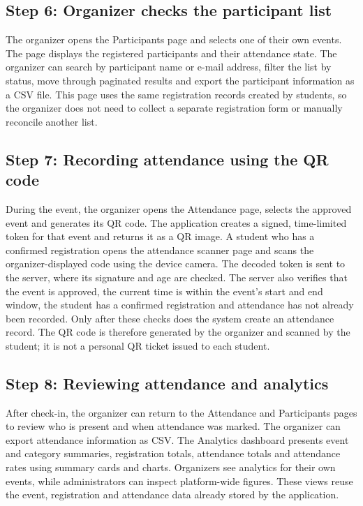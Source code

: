 \documentclass[11pt,a4paper]{article}
\begin{document}
\subsection{Step 6: Organizer checks the participant list}
The organizer opens the Participants page and selects one of their own events. The page displays
the registered participants and their attendance state. The organizer can search by participant
name or e-mail address, filter the list by status, move through paginated results and export the
participant information as a CSV file. This page uses the same registration records created by
students, so the organizer does not need to collect a separate registration form or manually
reconcile another list.

\subsection{Step 7: Recording attendance using the QR code}
During the event, the organizer opens the Attendance page, selects the approved event and
generates its QR code. The application creates a signed, time-limited token for that event and
returns it as a QR image. A student who has a confirmed registration opens the attendance
scanner page and scans the organizer-displayed code using the device camera. The decoded token
is sent to the server, where its signature and age are checked. The server also verifies that the
event is approved, the current time is within the event's start and end window, the student has a
confirmed registration and attendance has not already been recorded. Only after these checks
does the system create an attendance record. The QR code is therefore generated by the
organizer and scanned by the student; it is not a personal QR ticket issued to each student.

\subsection{Step 8: Reviewing attendance and analytics}
After check-in, the organizer can return to the Attendance and Participants pages to review who
is present and when attendance was marked. The organizer can export attendance information
as CSV. The Analytics dashboard presents event and category summaries, registration totals,
attendance totals and attendance rates using summary cards and charts. Organizers see analytics
for their own events, while administrators can inspect platform-wide figures. These views
reuse the event, registration and attendance data already stored by the application.
\end{document}
